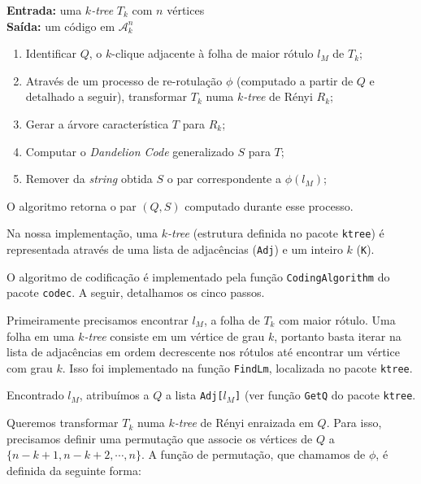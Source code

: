 \begin{algorithm}
  \textbf{Entrada:} uma \emph{$k$-tree} $T_k$ com $n$ vértices\\
  \textbf{Saída:} um código em $\mathcal{A}^n_k$

  \begin{enumerate}
    \item Identificar $Q$, o $k$-clique adjacente à folha de maior rótulo $l_M$ de $T_k$;
    \item Através de um processo de re-rotulação $\phi$ (computado a partir de $Q$ e detalhado a seguir), transformar $T_k$ numa \emph{$k$-tree} de Rényi $R_k$;
    \item Gerar a árvore característica $T$ para $R_k$;
    \item Computar o \emph{Dandelion Code} generalizado $S$ para $T$;
    \item Remover da \emph{string} obtida $S$ o par correspondente a $\phi(l_M)$;
  \end{enumerate}

  O algoritmo retorna o par $(Q, S)$ computado durante esse processo.

  \vspace{2em}

  Na nossa implementação, uma \emph{$k$-tree} (estrutura definida no pacote {\tt ktree}) é representada através de uma lista de adjacências ({\tt Adj}) e um inteiro $k$ ({\tt K}). %

  O algoritmo de codificação é implementado pela função {\tt CodingAlgorithm} do pacote {\tt codec}. A seguir, detalhamos os cinco passos.

  \begin{step}
    Primeiramente precisamos encontrar $l_M$, a folha de $T_k$ com maior rótulo. Uma folha em uma \emph{$k$-tree} consiste em um vértice de grau $k$, portanto basta iterar na lista de adjacências em ordem decrescente nos rótulos até encontrar um vértice com grau $k$. Isso foi implementado na função {\tt FindLm}, localizada no pacote {\tt ktree}.

    Encontrado $l_M$, atribuímos a $Q$ a lista {\tt Adj[$l_M$]} (ver função {\tt GetQ} do pacote {\tt ktree}.
  \end{step}

  \begin{step}
    Queremos transformar $T_k$ numa \emph{$k$-tree} de Rényi enraizada em $Q$. Para isso, precisamos definir uma permutação que associe os vértices de $Q$ a $\{n-k+1, n-k+2, \cdots, n\}$. A função de permutação, que chamamos de $\phi$, é definida da seguinte forma:


\end{step}
\end{algorithm}
